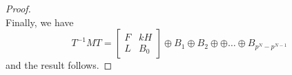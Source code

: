 \documentclass[preprint,12pt]{elsarticle}
\theoremstyle{definition}
\theoremstyle{remark}
\begin{document}
\begin{proof}
\[%
\]
Finally, we have
\[
T^{-1}MT =
\left[\begin{array}{cc}
F & kH \\L & B_0
\end{array}\right] \oplus B_1\oplus B_2 \oplus \oplus \ldots \oplus B_{p^N-p^{N-1}}
\]
and the result follows.


\end{proof}
\end{document}
